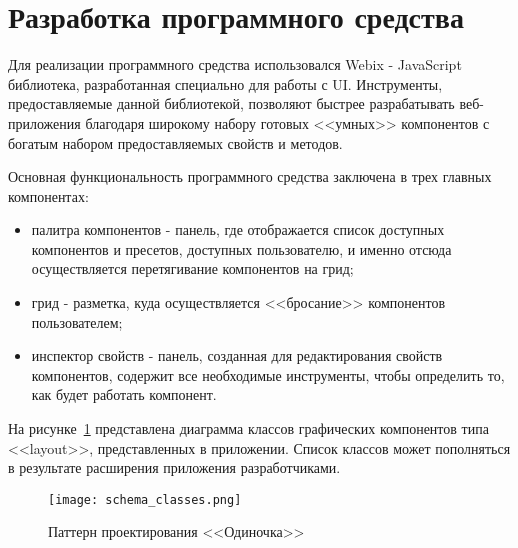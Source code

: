 \section{Разработка программного средства} 
\label{sec:development}

Для реализации программного средства использовался Webix - JavaScript библиотека, разработанная специально для работы с UI. Инструменты, предоставляемые данной библиотекой, позволяют быстрее разрабатывать веб-приложения благодаря широкому набору готовых <<умных>> компонентов с богатым набором предоставляемых свойств и методов.

Основная функциональность программного средства заключена в трех главных компонентах: 
\begin{itemize}
	\item палитра компонентов - панель, где отображается список доступных компонентов и пресетов, доступных пользователю, и именно отсюда осуществляется перетягивание компонентов на грид;
	\item грид - разметка, куда осуществляется <<бросание>> компонентов пользователем;
	\item инспектор свойств - панель, созданная для редактирования свойств компонентов, содержит все необходимые инструменты, чтобы определить то, как будет работать компонент.
\end{itemize}

На рисунке~\ref{sec:development:schema_classes} представлена диаграмма классов графических компонентов типа <<layout>>, представленных в приложении. Список классов может пополняться в результате расширения приложения разработчиками.\pagebreak

\begin{figure}[ht]
\centering
	\texttt{[image: schema\_classes.png]}
	\caption{Паттерн проектирования <<Одиночка>>}
	\label{sec:development:schema_classes}
\end{figure}







